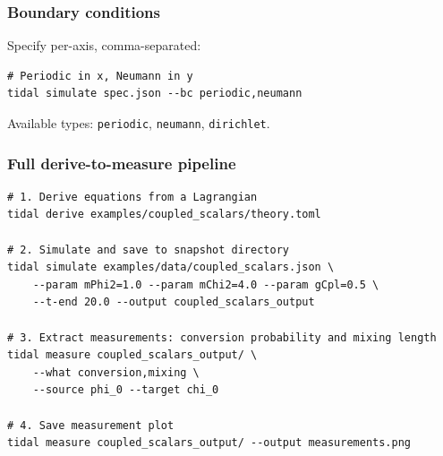 \subsubsection{Boundary conditions}

Specify per-axis, comma-separated:

\begin{lstlisting}[style=bash]
# Periodic in x, Neumann in y
tidal simulate spec.json --bc periodic,neumann
\end{lstlisting}

Available types: \texttt{periodic}, \texttt{neumann}, \texttt{dirichlet}.

\subsubsection{Full derive-to-measure pipeline}

\begin{lstlisting}[style=bash]
# 1. Derive equations from a Lagrangian
tidal derive examples/coupled_scalars/theory.toml

# 2. Simulate and save to snapshot directory
tidal simulate examples/data/coupled_scalars.json \
    --param mPhi2=1.0 --param mChi2=4.0 --param gCpl=0.5 \
    --t-end 20.0 --output coupled_scalars_output

# 3. Extract measurements: conversion probability and mixing length
tidal measure coupled_scalars_output/ \
    --what conversion,mixing \
    --source phi_0 --target chi_0

# 4. Save measurement plot
tidal measure coupled_scalars_output/ --output measurements.png
\end{lstlisting}
